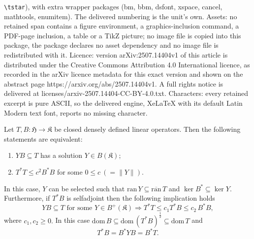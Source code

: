 \documentclass[10pt,a4paper]{amsart}
\newcommand{\D}{\mathrm{dom}\,}
\newcommand{\DB}{\mathrm{dom}\,B }
\newcommand{\DT}{\mathrm{dom}\,T }
\newcommand{\adj}{^*}
\newcommand{\bk}{B(\kk)}
\newcommand{\h}{\mathfrak{H}}
\newcommand{\halftsb}{( T^*B)^{\frac{1}{2}}}
\newcommand{\inclu}{\subseteq}
\newcommand{\kk}{\mathfrak{K}}
\renewcommand{\labelenumi}{(\arabic{enumi})}
\newcommand{\lplusk}{B^{+}(\kk)}
\newcommand{\n}{\|}
\newcommand{\ran}{\mathrm{ran}\,}
\newcommand{\ranbarT}{\mathrm{\overline{ran}}\, T}
\newcommand{\tstar}{T^{*}}
\begin{document}
\texttt{\textbackslash tstar}), with extra wrapper packages (bm, bbm, dsfont, xspace, cancel, mathtools, enumitem). The delivered numbering is the unit's own. Assets: no retained span contains a figure environment, a graphics-inclusion command, a PDF-page inclusion, a table or a TikZ picture; no image file is copied into this package, the package declares no asset dependency and no image file is redistributed with it. Licence: version arXiv:2507.14404v1 of this article is distributed under the Creative Commons Attribution 4.0 International licence, as recorded in the arXiv licence metadata for this exact version and shown on the abstract page https://arxiv.org/abs/2507.14404v1. A full rights notice is delivered at licenses/arxiv-2507.14404-CC-BY-4.0.txt. Characters: every retained excerpt is pure ASCII, so the delivered engine, XeLaTeX with its default Latin Modern text font, reports no missing character.
\begin{lemma} \label{lemprepthe}
Let $T,B:\h \rightarrow \kk $ be closed densely defined linear operators.  Then the following statements  are equivalent:
   \begin{enumerate}\def\labelenumi{\rm(\roman{enumi})}
     \item $Y B \inclu T$ has a solution $Y \in \bk;$
   \item   $T^* T  \leq c^2 B\adj B$  for some $0 \leq c \ (  =\n Y\n).$
      \end{enumerate}
     In this case, $Y$ can be selected such that $\ran Y \inclu \ranbarT$ and $\ker B\adj \inclu \ker Y.$ Furthermore,  if $\tstar B$ is selfadjoint then the following implication holds
      \begin{equation}\label{darkness1}
       Y B \inclu T  \text{ for some } Y \in \lplusk \Rightarrow T^* T  \leq  c_1  \tstar B \leq c_2 \, B\adj B,
      \end{equation}
       where $c_1,c_2 \geq 0.$
     In this case $\DB \inclu \D \halftsb \inclu  \DT$ and
       \begin{equation}\label{darkness2}
       \tstar B= B\adj Y B = B\adj T.
      \end{equation}
\end{lemma}
\end{document}

